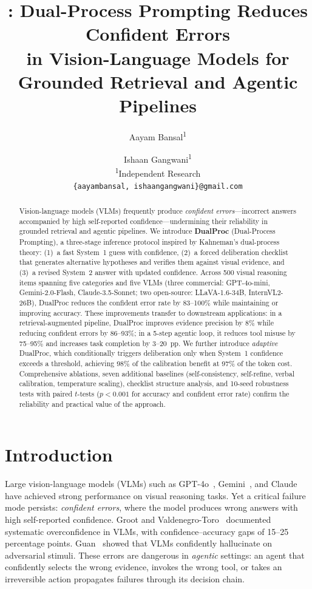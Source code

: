 \documentclass[10pt,twocolumn,letterpaper]{article}
\title{\method{}: Dual-Process Prompting Reduces Confident Errors\\in Vision-Language Models for Grounded Retrieval and Agentic Pipelines}
\author{Aayam Bansal\textsuperscript{1} \and Ishaan Gangwani\textsuperscript{1}\\
\textsuperscript{1}Independent Research\\
{\tt\small \{aayambansal, ishaangangwani\}@gmail.com}}
\newcommand{\method}{DualProc}
\newcommand{\methodfull}{Dual-Process Prompting}
\newcommand{\sone}{System~1}
\newcommand{\stwo}{System~2}
\begin{document}
\maketitle

\begin{abstract}
Vision-language models (VLMs) frequently produce \emph{confident errors}---incorrect answers accompanied by high self-reported confidence---undermining their reliability in grounded retrieval and agentic pipelines.
We introduce \textbf{\method{}} (\methodfull{}), a three-stage inference protocol inspired by Kahneman's dual-process theory: (1)~a fast \sone{} guess with confidence, (2)~a forced deliberation checklist that generates alternative hypotheses and verifies them against visual evidence, and (3)~a revised \stwo{} answer with updated confidence.
Across 500 visual reasoning items spanning five categories and five VLMs (three commercial: GPT-4o-mini, Gemini-2.0-Flash, Claude-3.5-Sonnet; two open-source: LLaVA-1.6-34B, InternVL2-26B), \method{} reduces the confident error rate by 83--100\% while maintaining or improving accuracy.
These improvements transfer to downstream applications: in a retrieval-augmented pipeline, \method{} improves evidence precision by 8\% while reducing confident errors by 86--93\%; in a 5-step agentic loop, it reduces tool misuse by 75--95\% and increases task completion by 3--20~pp.
We further introduce \emph{adaptive} \method{}, which conditionally triggers deliberation only when \sone{} confidence exceeds a threshold, achieving 98\% of the calibration benefit at 97\% of the token cost.
Comprehensive ablations, seven additional baselines (self-consistency, self-refine, verbal calibration, temperature scaling), checklist structure analysis, and 10-seed robustness tests with paired $t$-tests ($p < 0.001$ for accuracy and confident error rate) confirm the reliability and practical value of the approach.
\end{abstract}

\section{Introduction}
\label{sec:intro}

Large vision-language models (VLMs) such as GPT-4o~\cite{openai2024gpt4o}, Gemini~\cite{team2024gemini}, and Claude~\cite{anthropic2024claude} have achieved strong performance on visual reasoning tasks.
Yet a critical failure mode persists: \emph{confident errors}, where the model produces wrong answers with high self-reported confidence.
Groot and Valdenegro-Toro~\cite{groot2024overconfidence} documented systematic overconfidence in VLMs, with confidence--accuracy gaps of 15--25 percentage points.
Guan~\etal\cite{guan2024hallusionbench} showed that VLMs confidently hallucinate on adversarial stimuli.
These errors are dangerous in \emph{agentic} settings: an agent that confidently selects the wrong evidence, invokes the wrong tool, or takes an irreversible action propagates failures through its decision chain.
\end{document}
